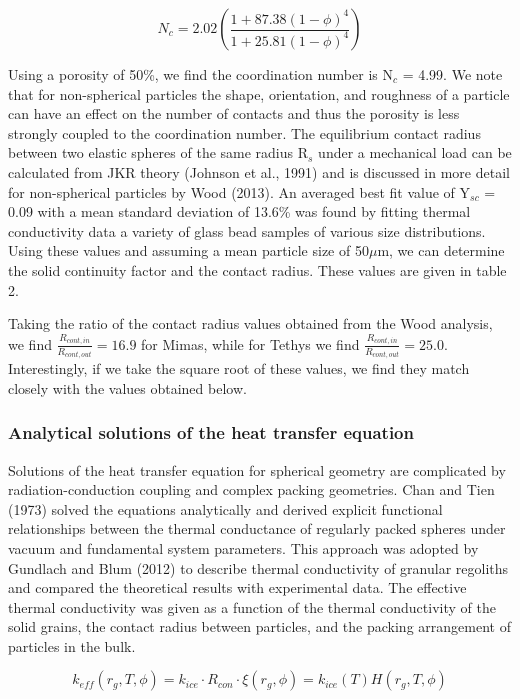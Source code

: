 \documentclass[11pt]{article} %
\begin{document}
	\begin{equation}
	N_{c} = 2.02 \left( \frac{1+87.38(1-\phi)^{4}}{1+25.81(1-\phi)^{4}} \right)
	\end{equation}
	
	Using a porosity of 50\%, we find the coordination number is N$_{c}$ = 4.99. We note that for non-spherical particles the shape, orientation, and roughness of a particle can have an effect on the number of contacts and thus the porosity is less strongly coupled to the coordination number. The equilibrium contact radius between two elastic spheres of the same radius R$_{s}$ under a mechanical load can be calculated from JKR theory (Johnson et al., 1991) and is discussed in more detail for non-spherical particles by Wood (2013). An averaged best fit value of Y$_{sc}$ = 0.09 with a mean standard deviation of 13.6\% was found by fitting thermal conductivity data a variety of glass bead samples of various size distributions. Using these values and assuming a mean particle size of 50$\mu$m, we can determine the solid continuity factor and the contact radius. These values are given in table 2. 
	
	Taking the ratio of the contact radius values obtained from the Wood analysis, we find $\frac{R_{cont,in}}{R_{cont,out}} = 16.9$ for Mimas, while for Tethys we find $\frac{R_{cont,in}}{R_{cont,out}} = 25.0$. Interestingly, if we take the square root of these values, we find they match closely with the values obtained below.
	
\subsubsection{Analytical solutions of the heat transfer equation}

	Solutions of the heat transfer equation for spherical geometry are complicated by radiation-conduction coupling and complex packing geometries. Chan and Tien (1973) solved the equations analytically and derived explicit functional relationships between the thermal conductance of regularly packed spheres under vacuum and fundamental system parameters. This approach was adopted by Gundlach and Blum (2012) to describe thermal conductivity of granular regoliths and compared the theoretical results with experimental data. The effective thermal conductivity was given as a function of the thermal conductivity of the solid grains, the contact radius between particles, and the packing arrangement of particles in the bulk.
	
	\begin{equation}
	k_{eff}(r_{g}, T, \phi) = k_{ice}\cdot R_{con} \cdot \xi(r_{g}, \phi)= k_{ice}(T) H(r_{g},T, \phi)
	\end{equation}
\end{document}

